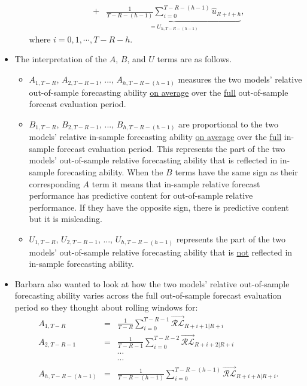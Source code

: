 \documentclass[11pt]{article}
\begin{document}
\begin{itemize}
\begin{itemize}
\begin{eqnarray}
\!\!\!\!&+&\!\!\!\!\underbrace{\frac{1}{T\!-\!R\!-\!(h\!-\!1)}\!\!\sum_{i=0}^{T-R-(h-1)}\!\!\widehat{u}_{R+i+h}}_{=U_{h,T\!-\!R\!-\!(h\!-\!1)}}, \nonumber
\end{eqnarray}
where $i=0, 1, \cdots, T-R-h$.
\end{itemize}
\item The interpretation of the $A$, $B$, and $U$ terms are as follows.
\begin{itemize}
\item $A_{1,T\!-\!R}$, $A_{2,T\!-\!R\!-\!1}$, ..., $A_{h,T\!-\!R\!-\!\!(h\!-\!1)}$ measures the two models' relative out-of-sample forecasting ability \underline{on average} over the \underline{full} out-of-sample forecast evaluation period.
\item $B_{1,T\!-\!R}$, $B_{2,T\!-\!R\!-\!1}$, ..., $B_{h,T\!-\!R\!-\!\!(h\!-\!1)}$ are proportional to the two models' relative in-sample forecasting ability \underline{on average} over the \underline{full} in-sample forecast evaluation period.  This represents the part of the two models' out-of-sample relative forecasting ability that is reflected in in-sample forecasting ability.  When the $B$ terms have the same sign as their corresponding $A$ term it means that in-sample relative forecast performance has predictive content for out-of-sample relative performance.  If they have the opposite sign, there is predictive content but it is misleading.
\item $U_{1,T\!-\!R}$, $U_{2,T\!-\!R\!-\!1}$, ..., $U_{h,T\!-\!R\!-\!\!(h\!-\!1)}$ represents the part of the two models' out-of-sample relative forecasting ability that is \underline{not} reflected in in-sample forecasting ability. 
\end{itemize}
\item Barbara also wanted to look at how the two models' relative out-of-sample forecasting ability varies across the full out-of-sample forecast evaluation period so they thought about rolling windows for:
\begin{eqnarray}
A_{1,T\!-\!R}\!\!\!\!&=&\!\!\!\!\frac{1}{T\!-\!R}\!\!\sum_{i=0}^{T-R-1}\!\!\overrightarrow{\mathcal{RL}}_{R+i+1|R+i} \nonumber \\
A_{2,T\!-\!R\!-\!1}\!\!\!\!&=&\!\!\!\!\frac{1}{T\!-\!R\!-\!1}\!\!\sum_{i=0}^{T-R-2}\!\!\overrightarrow{\mathcal{RL}}_{R+i+2|R+i} \nonumber \\
\!\!\!\!&&\!\!\!\!\cdots  \nonumber \\
\!\!\!\!&&\!\!\!\!\cdots  \nonumber \\
A_{h,T\!-\!R\!-\!\!(h\!-\!1)}\!\!\!\!&=&\!\!\!\!\frac{1}{T\!-\!R\!-\!(h\!-\!1)}\!\!\sum_{i=0}^{T-R-(h-1)}\!\!\overrightarrow{\mathcal{RL}}_{R+i+h|R+i}. \nonumber

\end{eqnarray}
\end{itemize}
\end{document}
